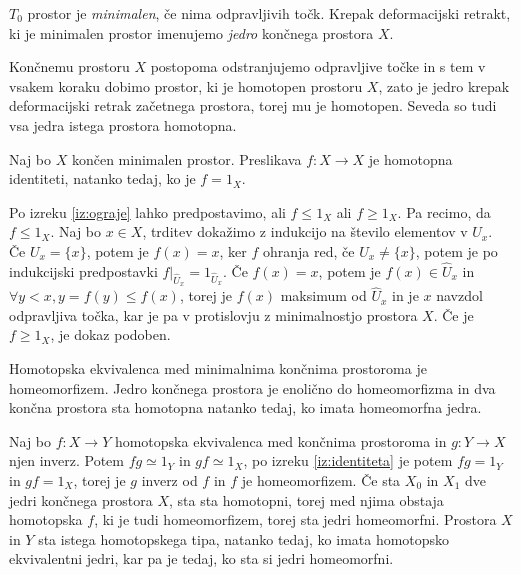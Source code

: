 \begin{definicija}
    $T_0$ prostor je \textit{minimalen}, če nima odpravljivih točk. Krepak deformacijski retrakt, ki je minimalen prostor imenujemo \textit{jedro} končnega prostora $X$.
\end{definicija}

Končnemu prostoru $X$ postopoma odstranjujemo odpravljive točke in s tem v vsakem koraku dobimo prostor, ki je homotopen prostoru $X$, zato je jedro krepak deformacijski retrak začetnega prostora, torej mu je homotopen. Seveda so tudi vsa jedra istega prostora homotopna.

\begin{izrek}
    \label{iz:identiteta}
    Naj bo $X$ končen minimalen prostor. Preslikava $f:X\rightarrow X$ je homotopna identiteti, natanko tedaj, ko je $f=1_X$.
\end{izrek}

\begin{dokaz}
    Po izreku \ref{iz:ograje} lahko predpostavimo, ali 
    $f\leq 1_X$ ali $f\geq 1_X$. %
    Pa recimo, da $f\leq 1_X$. 
    Naj bo $x\in X$, trditev dokažimo z indukcijo na 
    število elementov v $U_x$. Če $U_x=\{x\}$, potem je 
    $f(x)=x$, ker $f$ ohranja red, če $U_x\neq\{x\}$, potem 
    je po indukcijski predpostavki 
    $f|_{\hat{U}_x}=1_{\hat{U}_x}$. Če $f(x)=x$, potem je 
    $f(x)\in \hat{U}_x$ in $\forall y < x, y=f(y)\leq 
    f(x)$, torej je $f(x)$ maksimum od $\hat{U}_x$ in je 
    $x$ navzdol odpravljiva točka, kar je pa v protislovju 
    z minimalnostjo prostora $X$. Če je $f\geq 1_X$, je 
    dokaz podoben.
\end{dokaz}

\begin{izrek}
    Homotopska ekvivalenca med minimalnima končnima prostoroma je homeomorfizem. Jedro končnega prostora je enolično do homeomorfizma in dva končna prostora sta homotopna natanko tedaj, ko imata homeomorfna jedra.
\end{izrek}

\begin{dokaz}
    Naj bo $f:X\rightarrow Y$ homotopska ekvivalenca med 
    končnima prostoroma in $g:Y\rightarrow X$ njen inverz. 
    Potem $fg\simeq 1_Y$ in $gf \simeq 1_X$, po izreku 
    \ref{iz:identiteta} je potem $fg = 1_Y$ in $gf = 1_X$,
    torej je $g$ inverz od $f$ in $f$ je homeomorfizem. Če 
    sta $X_0$ in $X_1$ dve jedri končnega prostora $X$, sta 
    sta homotopni, torej med njima obstaja homotopska $f$, 
    ki je tudi homeomorfizem, torej sta jedri homeomorfni. 
    Prostora $X$ in $Y$ sta istega homotopskega tipa, 
    natanko tedaj, ko imata homotopsko ekvivalentni jedri, 
    kar pa je tedaj, ko sta si jedri homeomorfni.
\end{dokaz}


